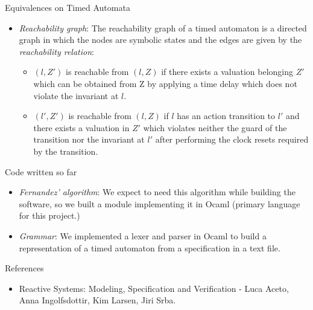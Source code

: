 \documentclass{beamer}
\begin{document}
\begin{frame}{Equivalences on Timed Automata}

  \begin{itemize}

    \item \emph{Reachability graph}: The reachability graph of a timed
      automaton is a directed graph in which the nodes are symbolic states
      and the edges are given by the \emph{reachability relation}:
      \begin{itemize}
      \item $(l,Z')$ is reachable from $(l,Z)$ if there exists a
        valuation belonging $Z'$ which can be obtained
        from Z by applying a time delay which does not violate the
        invariant at $l$.

      \item $(l', Z')$ is reachable from $(l, Z)$ if $l$ has an action
        transition to $l'$ and there exists a valuation in $Z'$ which
        violates neither the guard of the
        transition nor the invariant at $l'$ after performing the
        clock resets required by the transition.

      \end{itemize}

  \end{itemize}

\end{frame}

\begin{frame}{Code written so far}

  \begin{itemize}

    \item \emph{Fernandez' algorithm}: We expect to need this
      algorithm while building the software, so we built a module
      implementing it in Ocaml (primary language for this project.)

    \item \emph{Grammar}: We implemented a lexer and parser in Ocaml
      to build a representation of a timed automaton from a
      specification in a text file.

  \end{itemize}

\end{frame}

\begin{frame}{References}

\begin{itemize}
\item Reactive Systems: Modeling, Specification and Verification -
  Luca Aceto, Anna Ingolfsdottir, Kim Larsen, Jiri Srba.
\end{itemize}

\end{frame}
\end{document}
